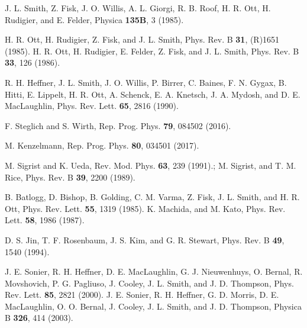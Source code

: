 \documentclass[twocolumn, prl]{revtex4}%
\begin{document}
\begin{thebibliography}{99}
  J. L. Smith, Z. Fisk, J. O. Willis, A. L. Giorgi, R. B. Roof, H. R. Ott, H. Rudigier, and E. Felder, Physica {\bf135B}, 3 (1985). 

 H. R. Ott, H. Rudigier, Z. Fisk, and J. L. Smith, Phys. Rev. B {\bf31},  (R)1651 (1985).
 H. R. Ott,  H. Rudigier, E. Felder, Z. Fisk, and J. L. Smith, Phys. Rev. B {\bf33}, 126 (1986).


 R. H. Heffner, J. L. Smith, J. O. Willis, P. Birrer, C. Baines, F. N. Gygax, B. Hitti, E. Lippelt, H. R. Ott, A. Schenck, E. A. Knetsch, J. A. Mydosh, and D. E. MacLaughlin, Phys. Rev. Lett. {\bf65}, 2816 (1990).



 F. Steglich and S. Wirth, Rep. Prog. Phys. {\bf79}, 084502 (2016).

 M. Kenzelmann, Rep. Prog. Phys. {\bf80}, 034501 (2017).

\color{black}


 M. Sigrist and K. Ueda, Rev. Mod. Phys. {\bf63}, 239 (1991).;
   M. Sigrist, and T. M. Rice, Phys. Rev. B {\bf39}, 2200 (1989).

 B. Batlogg, D. Bishop, B. Golding, C. M. Varma, Z. Fisk, J. L. Smith, and H. R. Ott, Phys. Rev. Lett. {\bf55}, 1319 (1985).
 K. Machida, and M. Kato, Phys. Rev. Lett. {\bf58}, 1986 (1987).


 D. S. Jin, T. F. Rosenbaum, J. S. Kim, and G. R. Stewart, Phys. Rev. B {\bf49},
 1540 (1994).


 J. E. Sonier, R. H. Heffner, D. E. MacLaughlin, G. J. Nieuwenhuys, O. Bernal, R. Movshovich, P. G. Pagliuso, J. Cooley, J. L. Smith, and J. D. Thompson,  Phys. Rev. Lett. {\bf85}, 2821 (2000).
   J. E. Sonier, R. H. Heffner, G. D. Morris,  D. E. MacLaughlin,  O.  O. Bernal,  J. Cooley, J. L. Smith, and J. D. Thompson,
 Physica B  {\bf326}, 414 (2003).



\end{thebibliography}
\end{document}
